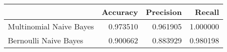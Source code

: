 \begin{tabular}{lrrr}
\toprule
 & Accuracy & Precision & Recall \\
\midrule
Multinomial Naive Bayes & 0.973510 & 0.961905 & 1.000000 \\
Bernoulli Naive Bayes & 0.900662 & 0.883929 & 0.980198 \\
\bottomrule
\end{tabular}
